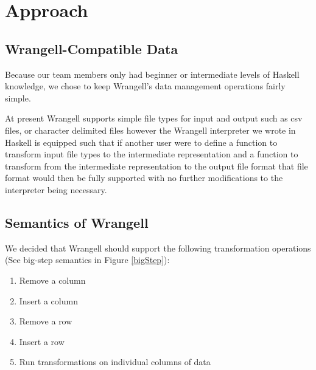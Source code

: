 \documentclass[preprint,nocopyrightspace]{sig-alternate}
\begin{document}
\section{Approach}

\subsection{Wrangell-Compatible Data}
Because our team members only had beginner or intermediate levels of Haskell knowledge, we chose to keep Wrangell's data management operations fairly simple. 

\begin{comment}
As a result, Wrangell's application subjects are limited to tables of data wherein columns are separated by either a comma or a user-specified delimiter. Furthermore, we allow the first row of data in a csv file to be a list of comma-separated labels, one for each column. We require that each column have a \emph{unique} label, to avoid ambiguity in potential future Wrangell features which may seek to identify columns per their labels. We decided to ultimately apply Wrangell to a variety of csv files. See Figure \ref{exampleTable} for an example of a Wrangell-compatible data table. 
\end{comment}
At present Wrangell supports simple file types for input and output such as csv files, or character delimited files however the Wrangell interpreter we wrote in Haskell is equipped such that if another user were to define a function to transform input file types to the intermediate representation and a function to transform from the intermediate representation to the output file format that file format would then be fully supported with no further modifications to the interpreter being necessary.


\subsection{Semantics of Wrangell}
We decided that Wrangell should support the following transformation operations (See big-step semantics in Figure \ref{bigStep}):
\begin{enumerate}
\item Remove a column
\item Insert a column
\item Remove a row
\item Insert a row
\item Run transformations on individual columns of data
\end{enumerate}
\end{document}
